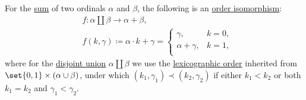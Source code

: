 \begin{proposition}\label{thm:ordinal_addition_disjoin_union}
  For the \hyperref[def:ordinal_arithmetic/addition]{sum} of two ordinals \( \alpha \) and \( \beta \), the following is an \hyperref[def:partially_ordered_set/morphism]{order isomorphism}:
  \begin{equation*}
    \begin{aligned}
      &f: \alpha \amalg \beta \to \alpha + \beta, \\
      &f(k, \gamma) \coloneqq \alpha \cdot k + \gamma = \begin{cases}
        \gamma,          &k = 0, \\
        \alpha + \gamma, &k = 1, \\
      \end{cases}
    \end{aligned}
  \end{equation*}
  where for the \hyperref[def:disjoint_union]{disjoint union} \( \alpha \amalg \beta \) we use the \hyperref[def:lexicographic_order]{lexicographic order} inherited from \( \set{ 0, 1 } \times (\alpha \cup \beta) \), under which \( (k_1, \gamma_1) \prec (k_2, \gamma_2) \) if either \( k_1 < k_2 \) or both \( k_1 = k_2 \) and \( \gamma_1 < \gamma_2 \).
\end{proposition}
